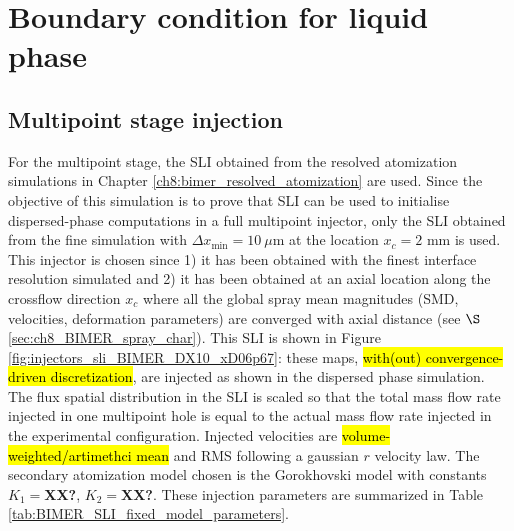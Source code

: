
\section{Boundary condition for liquid phase}
\label{sec:ch9_BIMER_BCs_for_liquid_phase}


\subsection{Multipoint stage injection}

For the multipoint stage, the SLI obtained from the resolved atomization simulations in Chapter \ref{ch8:bimer_resolved_atomization} are used. Since the objective of this simulation is to prove that SLI can be used to initialise dispersed-phase computations in a full multipoint injector, only the SLI obtained from the fine simulation with $\Delta x_\mathrm{min} = 10~\mu$m at the location $x_c = 2$ mm is used. This injector is chosen since 1) it has been obtained with the finest interface resolution simulated and 2) it has been obtained at an axial location along the crossflow direction $x_c$ where all the global spray mean magnitudes (SMD, velocities, deformation parameters) are converged with axial distance (see $\S$\ref{sec:ch8_BIMER_spray_char}). This SLI is shown in Figure \ref{fig:injectors_sli_BIMER_DX10_xD06p67}: these maps, \hl{with(out) convergence-driven discretization}, are injected as shown in the dispersed phase simulation. The flux spatial distribution in the SLI is scaled so that the total mass flow rate injected in one multipoint hole is equal to the actual mass flow rate injected in the experimental configuration. Injected velocities are \hl{volume-weighted/artimethci mean} and RMS following a gaussian $r$ velocity law. The secondary atomization model chosen is the Gorokhovski model with constants $K_1 = $\textbf{XX?}, $K_2 = $\textbf{XX?}. These injection parameters are summarized in Table  \ref{tab:BIMER_SLI_fixed_model_parameters}.


